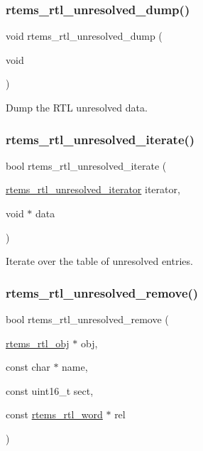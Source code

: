 \subsubsection{\texorpdfstring{rtems\_rtl\_unresolved\_dump()}{rtems\_rtl\_unresolved\_dump()}}
{\footnotesize\ttfamily void rtems\+\_\+rtl\+\_\+unresolved\+\_\+dump (\begin{DoxyParamCaption}\item[{void}]{ }\end{DoxyParamCaption})}

Dump the R\+TL unresolved data. \mbox{\label{rtl-unresolved_8h_a22858b7a26c780b4206aaa9cf3a08ec6}} 
\subsubsection{\texorpdfstring{rtems\_rtl\_unresolved\_iterate()}{rtems\_rtl\_unresolved\_iterate()}}
{\footnotesize\ttfamily bool rtems\+\_\+rtl\+\_\+unresolved\+\_\+iterate (\begin{DoxyParamCaption}\item[{\mbox{\hyperlink{rtl-unresolved_8h_ab256ab6d71a66bca9ea2f63a86026c9d}{rtems\+\_\+rtl\+\_\+unresolved\+\_\+iterator}}}]{iterator,  }\item[{void $\ast$}]{data }\end{DoxyParamCaption})}

Iterate over the table of unresolved entries. \mbox{\label{rtl-unresolved_8h_adc53555aa32e9182fb9f29c3bd2a88dd}} 
\subsubsection{\texorpdfstring{rtems\_rtl\_unresolved\_remove()}{rtems\_rtl\_unresolved\_remove()}}
{\footnotesize\ttfamily bool rtems\+\_\+rtl\+\_\+unresolved\+\_\+remove (\begin{DoxyParamCaption}\item[{\mbox{\hyperlink{structrtems__rtl__obj}{rtems\+\_\+rtl\+\_\+obj}} $\ast$}]{obj,  }\item[{const char $\ast$}]{name,  }\item[{const uint16\+\_\+t}]{sect,  }\item[{const \mbox{\hyperlink{rtl-unresolved_8h_a5ab1ca8c94e49686f84f5ccf0731f0e6}{rtems\+\_\+rtl\+\_\+word}} $\ast$}]{rel }\end{DoxyParamCaption})}

